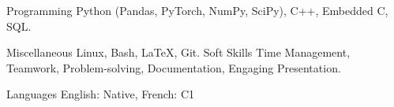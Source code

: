 

\begin{cvskills}

  \cvskill
    {Programming} %
    {Python (Pandas, PyTorch, NumPy, SciPy), C++, Embedded C, SQL.} %

  \cvskill
    {Miscellaneous} %
    {Linux, Bash, \LaTeX, Git.} %
  \cvskill
    {Soft Skills} %
    {Time Management, Teamwork, Problem-solving, Documentation, Engaging Presentation.} %
  
  \cvskill
    {Languages} %
    {English: Native, French: C1} %

\end{cvskills}
